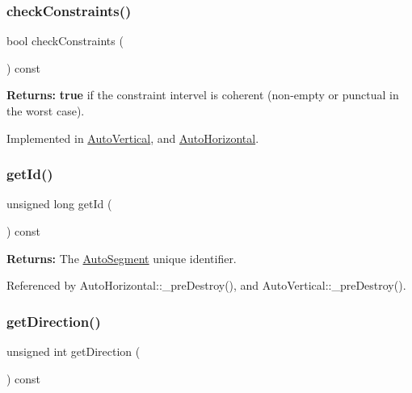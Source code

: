 \subsubsection{\texorpdfstring{check\+Constraints()}{checkConstraints()}}
{\footnotesize\ttfamily bool check\+Constraints (\begin{DoxyParamCaption}{ }\end{DoxyParamCaption}) const\hspace{0.3cm}{\ttfamily [pure virtual]}}

{\bfseries Returns\+:} {\bfseries true} if the constraint intervel is coherent (non-\/empty or punctual in the worst case). 

Implemented in \mbox{\hyperlink{classKatabatic_1_1AutoVertical_a8aef8f4bbafe3426840f9ebf31bb3b81}{Auto\+Vertical}}, and \mbox{\hyperlink{classKatabatic_1_1AutoHorizontal_a8aef8f4bbafe3426840f9ebf31bb3b81}{Auto\+Horizontal}}.

\mbox{\label{classKatabatic_1_1AutoSegment_afdedcef127ad2a3677a5b48d7d3453f3}} 
\subsubsection{\texorpdfstring{get\+Id()}{getId()}}
{\footnotesize\ttfamily unsigned long get\+Id (\begin{DoxyParamCaption}{ }\end{DoxyParamCaption}) const\hspace{0.3cm}{\ttfamily [inline]}}

{\bfseries Returns\+:} The \mbox{\hyperlink{classKatabatic_1_1AutoSegment}{Auto\+Segment}} unique identifier. 

Referenced by Auto\+Horizontal\+::\+\_\+pre\+Destroy(), and Auto\+Vertical\+::\+\_\+pre\+Destroy().

\mbox{\label{classKatabatic_1_1AutoSegment_ae35b78590ed6aa546b626ef95f28c533}} 
\subsubsection{\texorpdfstring{get\+Direction()}{getDirection()}}
{\footnotesize\ttfamily unsigned int get\+Direction (\begin{DoxyParamCaption}{ }\end{DoxyParamCaption}) const\hspace{0.3cm}{\ttfamily [pure virtual]}}

